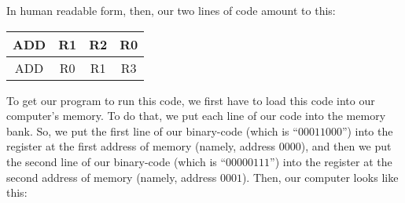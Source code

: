 \documentclass[../../../main.tex]{subfiles}
\begin{document}
In human readable form, then, our two lines of code amount to this:

\begin{center}
  \begin{tabular}{c c c c}
    \hline
    ADD & R1 & R2 & R0 \\ \hline
    ADD & R0 & R1 & R3 \\ \hline
  \end{tabular}
\end{center}

To get our program to run this code, we first have to load this code into our computer's memory. To do that, we put each line of our code into the memory bank. So, we put the first line of our binary-code (which is ``$00011000$'') into the register at the first address of memory (namely, address $0000$), and then we put the second line of our binary-code (which is ``$00000111$'') into the register at the second address of memory (namely, address $0001$). Then, our computer looks like this: 
\end{document}
